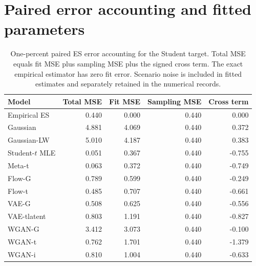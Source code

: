\documentclass[11pt]{article}
\theoremstyle{definition}\newtheorem{definition}[theorem]{Definition}
\theoremstyle{remark}\newtheorem{remark}[theorem]{Remark}
\begin{document}
\section{Paired error accounting and fitted parameters}
\begin{table}[htbp]
\centering\footnotesize
\setlength{\tabcolsep}{4pt}
\begin{tabular}{lrrrr}
\toprule
Model & Total MSE & Fit MSE & Sampling MSE & Cross term \\
\midrule
Empirical ES & 0.440 & 0.000 & 0.440 & 0.000 \\
Gaussian & 4.881 & 4.069 & 0.440 & 0.372 \\
Gaussian-LW & 5.010 & 4.187 & 0.440 & 0.383 \\
Student-$t$ MLE & 0.051 & 0.367 & 0.440 & -0.755 \\
Meta-t & 0.063 & 0.372 & 0.440 & -0.749 \\
Flow-G & 0.789 & 0.599 & 0.440 & -0.249 \\
Flow-t & 0.485 & 0.707 & 0.440 & -0.661 \\
VAE-G & 0.508 & 0.625 & 0.440 & -0.556 \\
VAE-tlatent & 0.803 & 1.191 & 0.440 & -0.827 \\
WGAN-G & 3.412 & 3.073 & 0.440 & -0.100 \\
WGAN-t & 0.762 & 1.701 & 0.440 & -1.379 \\
WGAN-i & 0.810 & 1.004 & 0.440 & -0.633 \\
\bottomrule
\end{tabular}
\caption{One-percent paired ES error accounting for the Student target. Total MSE equals fit MSE plus sampling MSE plus the signed cross term. The exact empirical estimator has zero fit error. Scenario noise is included in fitted estimates and separately retained in the numerical records.}\label{tab:r4-decomp-t}
\end{table}
\end{document}
